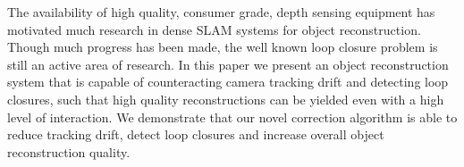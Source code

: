 The availability of high quality, consumer grade, depth sensing equipment has motivated much research in dense SLAM systems for
object reconstruction. Though much progress has been made, the well known loop closure problem is still an active area of research.
In this paper we present an object reconstruction system that is capable of counteracting camera tracking drift and detecting loop
closures, such that high quality reconstructions can be yielded even with a high level of interaction.
We demonstrate that our novel correction algorithm is able to reduce tracking drift, detect loop closures and increase overall
object reconstruction quality.